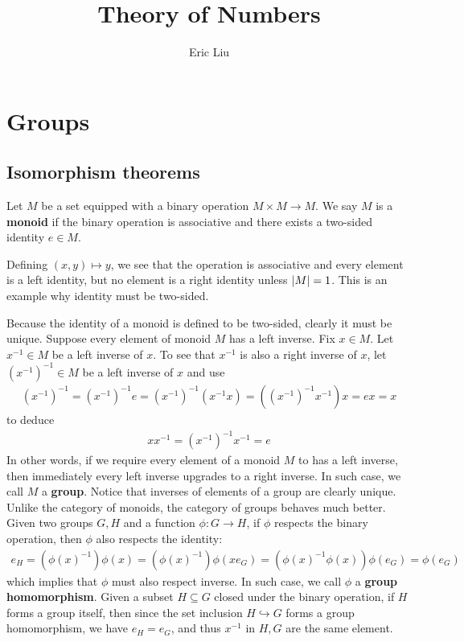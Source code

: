\documentclass{report}
\title{Theory of Numbers}
\author{Eric Liu}
\date{}
\begin{document}
\maketitle
\newpage %

\tableofcontents
\pagebreak
\chapter{Groups}
\section{Isomorphism theorems}
Let $M$ be a set equipped with a binary operation $M\times M \rightarrow M$. We say $M$ is a \textbf{monoid} if the binary operation is associative and there exists a two-sided identity $e \in M$. 
\begin{example}
Defining $(x,y)\mapsto y$, we see that the operation is associative and every element is a left identity, but no element is a right identity unless $\left|M\right|=1$. This is an example why identity must be two-sided. 
\end{example}
Because the identity of a monoid is defined to be two-sided, clearly it must be unique.  Suppose every element of monoid $M$ has a left inverse. Fix $x \in M$. Let $x^{-1}\in M$ be a left inverse of $x$. To see that  $x^{-1}$ is also a right inverse of $x$, let  $(x^{-1})^{-1}\in M$ be a left inverse of $x$ and use  
\begin{align*}
  (x^{-1})^{-1}=(x^{-1})^{-1}e=(x^{-1})^{-1}(x^{-1}x)= ((x^{-1})^{-1}x^{-1})x= ex=x
\end{align*}
to deduce
\begin{align*}
xx^{-1}=(x^{-1})^{-1}x^{-1}= e
\end{align*}
In other words, if we require every element of a monoid $M$ to has a left inverse, then immediately every left inverse upgrades to a right inverse. In such case, we call $M$ a  \textbf{group}. Notice that inverses of elements of a group are clearly unique. \\

Unlike the category of monoids, the category of groups behaves much better. Given two groups $G,H$ and a function  $\phi : G\rightarrow H$, if $\phi$ respects the binary operation, then $\phi$ also respects the identity:
\begin{align*}
e_H = (\phi (x)^{-1})\phi (x) = (\phi(x)^{-1}) \phi(x e_G) =  (\phi (x)^{-1} \phi (x)) \phi (e_G)=\phi (e_G)
\end{align*}
which implies that $\phi$ must also respect inverse. In such case, we call $\phi$ a \textbf{group homomorphism}. Given a subset $H \subseteq G$ closed under the binary operation, if $H$ forms a group itself, then since the set inclusion $H \hookrightarrow G$ forms a group homomorphism, we have $e_H=e_G$, and thus $x^{-1}$ in $H,G$ are the same element. \\
\end{document}
